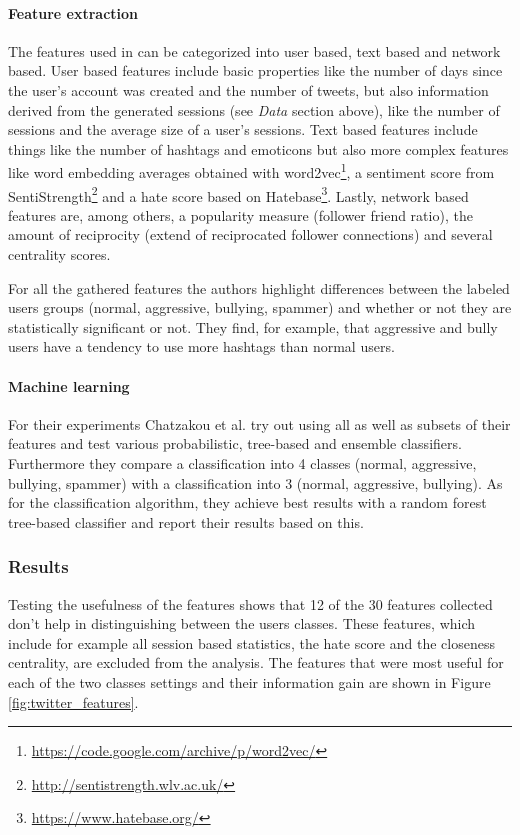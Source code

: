 \documentclass{proseminar}
\begin{document}
\paragraph{Feature extraction} The features used in \cite{Twitter:2017} can be categorized into user based, text based and network based. User based features include basic properties like the number of days since the user's account was created and the number of tweets, but also information derived from the generated sessions (see \emph{Data} section above), like the number of sessions and the average size of a user's sessions. Text based features include things like the number of hashtags and emoticons but also more complex features like word embedding averages obtained with word2vec\footnote{\url{https://code.google.com/archive/p/word2vec/}}, a sentiment score from SentiStrength\footnote{\url{http://sentistrength.wlv.ac.uk/}} and a hate score based on Hatebase\footnote{\url{https://www.hatebase.org/}}. Lastly, network based features are, among others, a popularity measure (follower friend ratio), the amount of reciprocity (extend of reciprocated follower connections) and several centrality scores.

For all the gathered features the authors highlight differences between the labeled users groups (normal, aggressive, bullying, spammer) and whether or not they are statistically significant or not. They find, for example, that aggressive and bully users have a tendency to use more hashtags than normal users.


\paragraph{Machine learning} For their experiments Chatzakou et al. try out using all as well as subsets of their features and test various probabilistic, tree-based and ensemble classifiers. Furthermore they compare a classification into 4 classes (normal, aggressive, bullying, spammer) with a classification into 3 (normal, aggressive, bullying). As for the classification algorithm, they achieve best results with a random forest tree-based classifier and report their results based on this.

\subsubsection{Results} Testing the usefulness of the features shows that 12 of the 30 features collected don't help in distinguishing between the users classes. These features, which include for example all session based statistics, the hate score and the closeness centrality, are excluded from the analysis. The features that were most useful for each of the two classes settings and their information gain are shown in Figure \ref{fig:twitter_features}.
\end{document}
